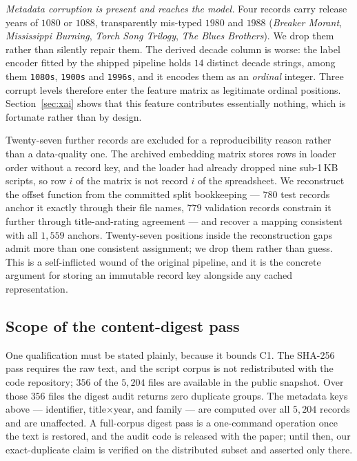 \documentclass[conference,a4paper]{IEEEtran}
\begin{document}
\emph{Metadata corruption is present and reaches the model.} Four records
carry release years of $1080$ or $1088$, transparently mis-typed $1980$
and $1988$ (\emph{Breaker Morant}, \emph{Mississippi Burning},
\emph{Torch Song Trilogy}, \emph{The Blues Brothers}). We drop them
rather than silently repair them. The derived decade column is worse: the
label encoder fitted by the shipped pipeline holds $14$ distinct decade
strings, among them \texttt{1080s}, \texttt{1900s} and \texttt{1996s},
and it encodes them as an \emph{ordinal} integer. Three corrupt levels
therefore enter the feature matrix as legitimate ordinal positions.
Section~\ref{sec:xai} shows that this feature contributes essentially
nothing, which is fortunate rather than by design.

Twenty-seven further records are excluded for a reproducibility reason
rather than a data-quality one. The archived embedding matrix stores rows
in loader order without a record key, and the loader had already dropped
nine sub-1\,KB scripts, so row $i$ of the matrix is not record $i$ of the
spreadsheet. We reconstruct the offset function from the committed split
bookkeeping --- $780$ test records anchor it exactly through their file
names, $779$ validation records constrain it further through
title-and-rating agreement --- and recover a mapping consistent with all
$1{,}559$ anchors. Twenty-seven positions inside the reconstruction gaps
admit more than one consistent assignment; we drop them rather than
guess. This is a self-inflicted wound of the original pipeline, and it is
the concrete argument for storing an immutable record key alongside any
cached representation.

\subsection{Scope of the content-digest pass}
\label{sec:hashscope}

One qualification must be stated plainly, because it bounds C1. The
SHA-256 pass requires the raw text, and the script corpus is not
redistributed with the code repository; $356$ of the $5{,}204$ files are
available in the public snapshot. Over those $356$ files the digest audit
returns zero duplicate groups. The metadata keys above --- identifier,
title$\times$year, and family --- are computed over all $5{,}204$
records and are unaffected. A full-corpus digest pass is a one-command
operation once the text is restored, and the audit code is released with
the paper; until then, our exact-duplicate claim is verified on the
distributed subset and asserted only there.
\end{document}
